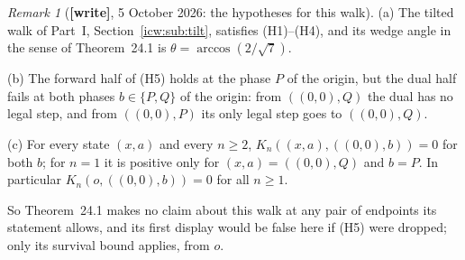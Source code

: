 \documentclass[11pt,letterpaper]{article}
\theoremstyle{remark}\newtheorem{remark}[theorem]{Remark}
\newcommand{\1}{\mathbf1}
\newcommand{\wtag}{\textup{\textbf{[write]}}}
\begin{document}
\begin{remark}[\wtag, 5 October 2026: the hypotheses for this walk]\label{icw:log:rem:seeds}
\textup{(a)} The tilted walk of Part~I, Section~\ref{icw:sub:tilt}, satisfies \textup{(H1)--(H4)}, and its wedge angle in the sense of Theorem~24.1 is $\theta=\arccos(2/\sqrt7)$.

\textup{(b)} The forward half of \textup{(H5)} holds at the phase $P$ of the origin, but the dual half fails at both phases $b\in\{P,Q\}$ of the origin: from $((0,0),Q)$ the dual has no legal step, and from $((0,0),P)$ its only legal step goes to $((0,0),Q)$.

\textup{(c)} For every state $(x,a)$ and every $n\ge2$, $K_n((x,a),((0,0),b))=0$ for both $b$; for $n=1$ it is positive only for $(x,a)=((0,0),Q)$ and $b=P$. In particular $K_n(o,((0,0),b))=0$ for all $n\ge1$.

So Theorem~24.1 makes no claim about this walk at any pair of endpoints its statement allows, and its first display would be false here if \textup{(H5)} were dropped; only its survival bound applies, from $o$.
\end{remark}
\end{document}
